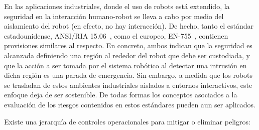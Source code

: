 \documentclass[withindex,glossary]{cam-thesis}
\begin{document}
En las aplicaciones industriales, donde el uso de robots está extendido, la seguridad en la interacción humano-robot se lleva a cabo por medio del aislamiento del robot (en efecto, no hay interacción). De hecho, tanto el estándar estadounidense, ANSI/RIA 15.06~\cite{ANSIRIA1506}, como el europeo, EN-755~\cite{Gaskill1996}, contienen provisiones similares al respecto. En concreto, ambos indican que la seguridad es alcanzada definiendo una región al rededor del robot que debe ser custodiada, y que la acción a ser tomada por el sistema robótico al detectar una intrusión en dicha región es una parada de emergencia. Sin embargo, a medida que los robots se trasladan de estos ambientes industriales aislados a entornos interactivos, este enfoque deja de ser sostenible. De todas formas los conceptos asociados a la evaluación de los riesgos contenidos en estos estándares pueden aun ser aplicados.

Existe una jerarquía de controles operacionales para mitigar o eliminar peligros: 
\end{document}
